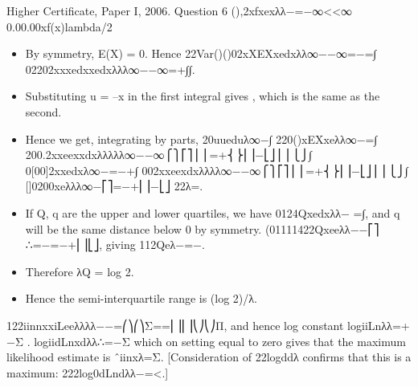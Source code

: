 \documentclass[a4paper,12pt]{article}
\begin{document}
Higher Certificate, Paper I, 2006. Question 6
(),2xfxexλλ−=−∞<<∞
0.00.00xf(x)lambda/2

\begin{itemize}
    \item By symmetry, E(X) = 0.
Hence 22Var()()02xXEXxedxλλ∞−−∞=−=∫ {}02202xxxedxxedxλλλ∞−−∞=+∫∫.
\item Substituting u = –x in the first integral gives , which is the same as the second.
\item Hence we get, integrating by parts, 20uueduλ∞−∫
220()xEXxeλλ∞−=∫
200.2xxeexxdxλλλλλ∞−−∞⎧⎫⎡⎤⎪⎪=+⎨⎬⎢⎥−⎣⎦⎪⎪⎩⎭∫
0[00]2xxedxλ∞−=−+∫
002xxeexdxλλλλ∞−−∞⎧⎫⎡⎤⎪⎪=+⎨⎬⎢⎥−⎣⎦⎪⎪⎩⎭∫
[]0200xeλλλ∞−⎡⎤=−+⎢⎥−⎣⎦ 22λ=.

\item If Q, q are the upper and lower quartiles, we have 0124Qxedxλλ− =∫, and q will be the same distance below 0 by symmetry.
(01111422Qxeeλλ−−⎡⎤ ∴=−=−+⎢⎥⎣⎦, giving 112Qeλ−=−. \item Therefore λQ = log 2.
\item Hence the semi-interquartile range is (log 2)/λ.
\end{itemize}

122iinnxxiLeeλλλλ−−=⎛⎞⎛⎞Σ==⎜⎟⎜⎟⎝⎠⎝⎠Π, and hence log constant logiiLnλλ=+−Σ .
logiidLnxdλλ∴=−Σ which on setting equal to zero gives that the maximum likelihood estimate is ˆiinxλ=Σ. [Consideration of 22logddλ confirms that this is a maximum: 222log0dLndλλ−=<.]
\end{document}
